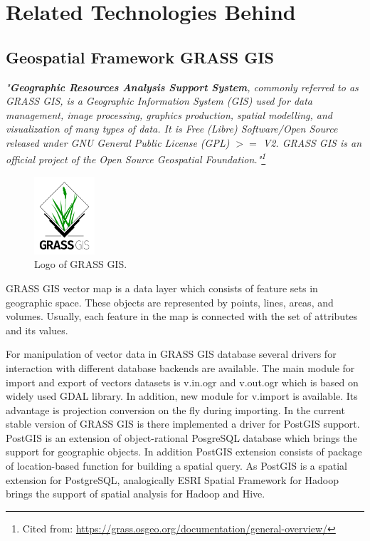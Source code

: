 \documentclass[a4paper,12pt,oneside]{report}
\begin{document}
	
	\section{Related Technologies Behind}
	\subsection{Geospatial Framework GRASS GIS}
	
	\textit{"\textbf{Geographic Resources Analysis Support System}, 
		commonly referred to as GRASS GIS, is a Geographic Information System (GIS) used
		for data management, image processing, graphics production, 
		spatial modelling, and visualization of many types of data. It is Free (Libre)
		Software/Open Source released under GNU General Public License 
		(GPL) $>=$ V2. GRASS GIS is an official project of the Open Source Geospatial
		Foundation."\footnote{Cited from:
			\url{https://grass.osgeo.org/documentation/general-overview/}}}
	
	\begin{figure}[!htbp]
		\centering
		\includegraphics[width=0.2\textwidth]{./img/grasslogo.png}
		\caption[Logo GRASS]{\centering Logo of GRASS GIS.}
	\end{figure}   
	GRASS GIS vector map is a data layer which consists of feature sets in
	geographic space. These objects are represented by points, lines, areas, and volumes. Usually,
	each feature in the map is  connected with the set of attributes and its values.
	
	For manipulation of vector data in GRASS GIS database several drivers for interaction with different database backends are available. The main module for import and export of vectors datasets is
	v.in.ogr and v.out.ogr which is based on widely used GDAL library. In addition, new module for v.import is available. Its advantage is projection conversion on the fly during importing.
	In the current stable version of GRASS GIS is there implemented a driver for PostGIS
	support. PostGIS is an extension of object-rational PosgreSQL database which brings the support for
	geographic objects. In addition PostGIS extension consists of package of 
	location-based function for building a spatial query.  
	As PostGIS is a spatial extension for PostgreSQL, analogically ESRI Spatial
	Framework for Hadoop brings the support of spatial analysis for Hadoop and  Hive.
	
\end{document}
